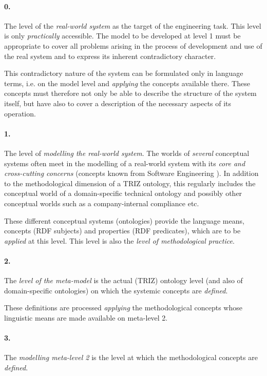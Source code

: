 \documentclass[12pt,a4paper]{article}
\begin{document}
\paragraph{0.}
The level of the \emph{real-world system} as the target of the engineering
task. This level is only \emph{practically} accessible. The model to be
developed at level 1 must be appropriate to cover all problems arising in the
process of development and use of the real system and to express its inherent
contradictory character.

This contradictory nature of the system can be formulated only in language
terms, i.e. on the model level and \emph{applying} the concepts available
there.  These concepts must therefore not only be able to describe the
structure of the system itself, but have also to cover a description of the
necessary aspects of its operation.

\paragraph{1.}
The level of \emph{modelling the real-world system}. The worlds of
\emph{several} conceptual systems often meet in the modelling of a real-world
system with its \emph{core and cross-cutting concerns} (concepts known from
Software Engineering \cite{22}). In addition to the methodological dimension
of a TRIZ ontology, this regularly includes the conceptual world of a
domain-specific technical ontology and possibly other conceptual worlds such
as a company-internal compliance etc.

These different conceptual systems (ontologies) provide the language means,
concepts (RDF subjects) and properties (RDF predicates), which are to be
\emph{applied} at this level. This level is also the \emph{level of
  methodological practice}.

\paragraph{2.}
The \emph{level of the meta-model} is the actual (TRIZ) ontology level (and
also of domain-specific ontologies) on which the systemic concepts are
\emph{defined}.

These definitions are processed \emph{applying} the methodological concepts
whose linguistic means are made available on meta-level 2.

\paragraph{3.}
The \emph{modelling meta-level 2} is the level at which the methodological
concepts are \emph{defined}.
\end{document}
